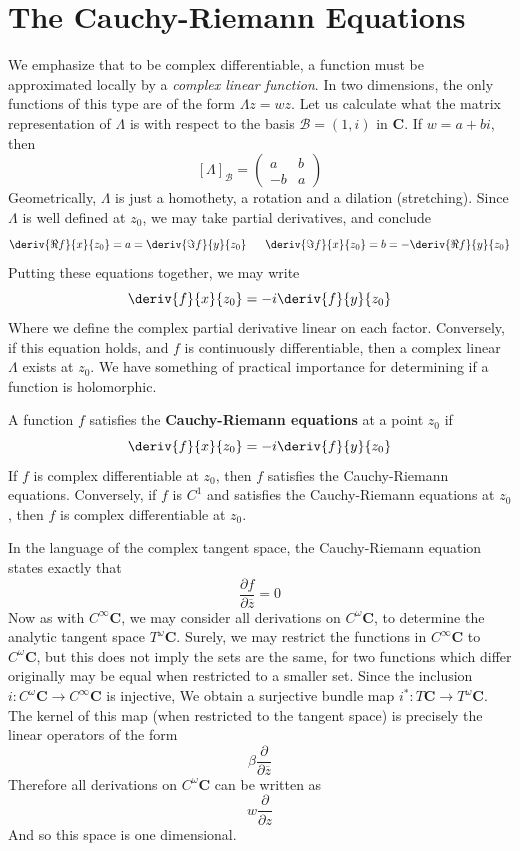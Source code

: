 \section{The Cauchy-Riemann Equations}

We emphasize that to be complex differentiable, a function must be approximated locally by a {\it complex linear function}. In two dimensions, the only functions of this type are of the form $\Lambda z = wz$. Let us calculate what the matrix representation of $\Lambda$ is with respect to the basis $\mathcal{B} = (1, i)$ in $\mathbf{C}$. If $w = a + bi$, then
%
\[ [\Lambda]_{\mathcal{B}} = \begin{pmatrix} a & b \\ -b & a \end{pmatrix} \]
%
Geometrically, $\Lambda$ is just a homothety, a rotation and a dilation (stretching). Since $\Lambda$ is well defined at $z_0$, we may take partial derivatives, and conclude
%
\[ \deriv{\Re f}{x}{z_0} = a = \deriv{\Im f}{y}{z_0}\ \ \ \ \ \deriv{\Im f}{x}{z_0} = b = -\deriv{\Re f}{y}{z_0} \]
%
Putting these equations together, we may write
%
\[ \deriv{f}{x}{z_0} = -i \deriv{f}{y}{z_0} \]
%
Where we define the complex partial derivative linear on each factor. Conversely, if this equation holds, and $f$ is continuously differentiable, then a complex linear $\Lambda$ exists at $z_0$. We have something of practical importance for determining if a function is holomorphic.

\begin{theorem}
    A function $f$ satisfies the {\bf Cauchy-Riemann equations} at a point $z_0$ if
    \[ \deriv{f}{x}{z_0} = -i \deriv{f}{y}{z_0} \]
    If $f$ is complex differentiable at $z_0$, then $f$ satisfies the Cauchy-Riemann equations. Conversely, if $f$ is $C^1$ and satisfies the Cauchy-Riemann equations at $z_0$, then $f$ is complex differentiable at $z_0$.
\end{theorem}

In the language of the complex tangent space, the Cauchy-Riemann equation states exactly that
%
\[ \frac{\partial f}{\partial \overline{z}} = 0 \]
%
Now as with $C^\infty \mathbf{C}$, we may consider all derivations on $C^\omega \mathbf{C}$, to determine the analytic tangent space $T^\omega \mathbf{C}$. Surely, we may restrict the functions in $C^\infty \mathbf{C}$ to $C^\omega \mathbf{C}$, but this does not imply the sets are the same, for two functions which differ originally may be equal when restricted to a smaller set. Since the inclusion $i:C^\omega \mathbf{C} \to C^\infty \mathbf{C}$ is injective, We obtain a surjective bundle map $i^*: T \mathbf{C} \to T^\omega \mathbf{C}$. The kernel of this map (when restricted to the tangent space) is precisely the linear operators of the form
%
\[ \beta \frac{\partial}{\partial \overline{z}} \]
%
Therefore all derivations on $C^\omega \mathbf{C}$ can be written as
%
\[ w \frac{\partial}{\partial z} \]
%
And so this space is one dimensional.

